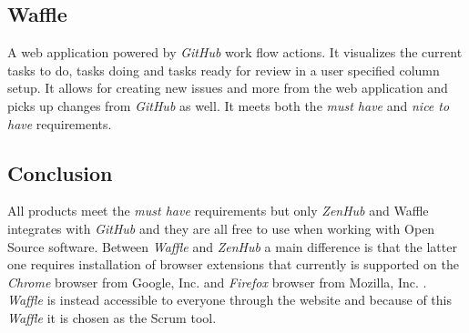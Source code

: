 \subsection*{Waffle}
A web application powered by \textit{GitHub} work flow actions. 
It visualizes the current tasks to do, tasks doing and tasks ready for review in a user specified column setup. 
It allows for creating new issues and more from the web application and picks up changes from \textit{GitHub} as well. 
It meets both the \textit{must have} and \textit{nice to have} requirements.

\subsection*{Conclusion}
All products meet the \textit{must have} requirements but only \textit{ZenHub} and Waffle integrates with \textit{GitHub} and they are all free to use when working with Open Source software.
Between \textit{Waffle} and \textit{ZenHub} a main difference is that the latter one requires installation of browser extensions that currently is supported on the \textit{Chrome} browser from Google, Inc. and \textit{Firefox} browser from Mozilla, Inc.  \citep{preStudy:scrum:zenhub}.
\textit{Waffle} is instead accessible to everyone through the website and because of this \textit{Waffle} it is chosen as the Scrum tool.

